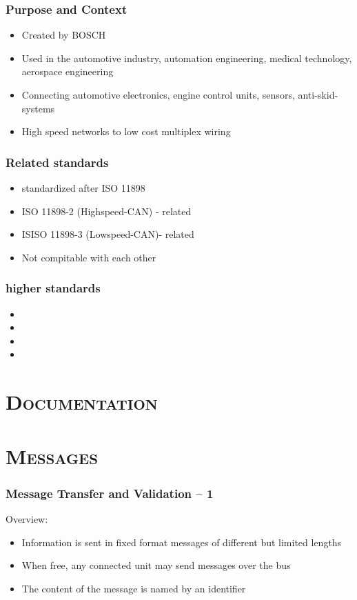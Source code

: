 \documentclass[xcolor=x11names,compress]{beamer}
\renewcommand{\(}{\begin{columns}}
\renewcommand{\)}{\end{columns}}
\newcommand{\<}[1]{\begin{column}{#1}}
\renewcommand{\>}{\end{column}}
\begin{document}
\begin{frame}
  \frametitle{Purpose and Context }
  \begin{itemize}
      \item Created by BOSCH
      \item Used in the automotive industry, automation engineering, medical technology, aerospace engineering
      \item Connecting automotive electronics, engine control units, sensors, anti-skid-systems
      \item High speed networks to low cost multiplex wiring
  \end{itemize}

\end{frame}

\begin{frame}
  \frametitle{Related standards}
  \begin{itemize}
      \item standardized after ISO 11898
      \item ISO 11898-2 (Highspeed-CAN) - related
      \item ISISO 11898-3 (Lowspeed-CAN)- related      
      \item Not compitable with each other
  \end{itemize}

\end{frame}

\begin{frame}
  \frametitle{higher standards}
  \begin{itemize}
      \item 
      \item 
      \item     
      \item 
  \end{itemize}

\end{frame}

\section{\scshape Documentation}

\section{\scshape Messages}
\begin{frame}
  \frametitle{Message Transfer and Validation -- 1}
  Overview:
  \begin{itemize}
    \item Information is sent in fixed format messages of different but limited lengths
    \item When free, any connected unit may send messages over the bus
    \item The content of the message is named by an identifier
  \end{itemize}

\end{frame}
\end{document}
